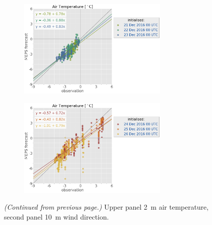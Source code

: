 \begin{figure}
	\begin{subfigure}[b]{0.49\textwidth}
		\centering
		\includegraphics[trim={25.cm 15.5cm 0cm 3.6cm},clip,
		width=0.8\textwidth]{./fig_sfc_temp/obs_model_20161221_23_00}
	\end{subfigure}
	\begin{subfigure}[b]{0.49\textwidth}
		\centering
		\includegraphics[trim={25.cm 15.5cm 0cm 3.6cm},clip,
		width=0.8\textwidth]{./fig_sfc_temp/obs_model_20161224_26_00}
	\end{subfigure}
    \caption{\textit{(Continued from previous page.)} Upper panel \SI{2}{\metre} air temperature, second panel \SI{10}{\metre} wind direction.}
\end{figure}

